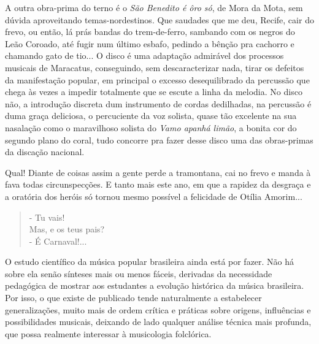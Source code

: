 A outra obra-prima do terno é o \emph{São Benedito é ôro só}, de Mora da
Mota, sem dúvida aproveitando temas-nordestinos. Que saudades que me
deu, Recife, cair do frevo, ou então, lá prás bandas do trem-de-ferro,
sambando com os negros do Leão Coroado, até fugir num último esbafo,
pedindo a bênção pra cachorro e chamando gato de tio... O disco é uma
adaptação admirável dos processos musicais de Maracatus, conseguindo,
sem descaracterizar nada, tirar os defeitos da manifestação popular, em
principal o excesso desequilibrado da percussão que chega às vezes a
impedir totalmente que se escute a linha da melodia. No disco não, a
introdução discreta dum instrumento de cordas dedilhadas, na percussão é
duma graça deliciosa, o percuciente da voz solista, quase tão excelente
na sua nasalação como o maravilhoso solista do \emph{Vamo apanhá limão},
a bonita cor do segundo plano do coral, tudo concorre pra fazer desse
disco uma das obras-primas da discação nacional.

Qual! Diante de coisas assim a gente perde a tramontana, cai no frevo e
manda à fava todas circunspecções. E tanto mais este ano, em que a
rapidez da desgraça e a oratória dos heróis só tornou mesmo possível a
felicidade de Otília Amorim...

\begin{verse}
- Tu vais!\\
Mas, e os teus pais?\\
- É Carnaval!...
\end{verse}




O estudo científico da música popular brasileira ainda está por fazer.
Não há sobre ela senão sínteses mais ou menos fáceis, derivadas da
necessidade pedagógica de mostrar aos estudantes a evolução histórica da
música brasileira. Por isso, o que existe de publicado tende
naturalmente a estabelecer generalizações, muito mais de ordem crítica e
práticas sobre origens, influências e possibilidades musicais, deixando
de lado qualquer análise técnica mais profunda, que possa realmente
interessar à musicologia folclórica.

